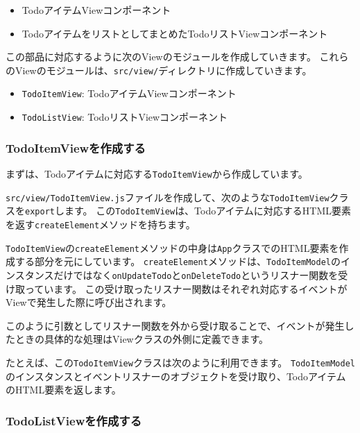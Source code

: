 \begin{itemize}
\item
  TodoアイテムViewコンポーネント
\item
  TodoアイテムをリストとしてまとめたTodoリストViewコンポーネント
\end{itemize}

この部品に対応するように次のViewのモジュールを作成していきます。
これらのViewのモジュールは、\texttt{src/view/}ディレクトリに作成していきます。

\begin{itemize}
\item
  \texttt{TodoItemView}: TodoアイテムViewコンポーネント
\item
  \texttt{TodoListView}: TodoリストViewコンポーネント
\end{itemize}

\hypertarget{TodoItemView}{%
\subsubsection{TodoItemViewを作成する}\label{TodoItemView}}

まずは、Todoアイテムに対応する\texttt{TodoItemView}から作成しています。

\texttt{src/view/TodoItemView.js}ファイルを作成して、次のような\texttt{TodoItemView}クラスを\texttt{export}します。
この\texttt{TodoItemView}は、Todoアイテムに対応するHTML要素を返す\texttt{createElement}メソッドを持ちます。
\newpage


\texttt{TodoItemView}の\texttt{createElement}メソッドの中身は\texttt{App}クラスでのHTML要素を作成する部分を元にしています。
\texttt{createElement}メソッドは、\texttt{TodoItemModel}のインスタンスだけではなく\texttt{onUpdateTodo}と\texttt{onDeleteTodo}というリスナー関数を受け取っています。
この受け取ったリスナー関数はそれぞれ対応するイベントがViewで発生した際に呼び出されます。

このように引数としてリスナー関数を外から受け取ることで、イベントが発生したときの具体的な処理はViewクラスの外側に定義できます。

たとえば、この\texttt{TodoItemView}クラスは次のように利用できます。
\texttt{TodoItemModel}のインスタンスとイベントリスナーのオブジェクトを受け取り、TodoアイテムのHTML要素を返します。



\hypertarget{TodoListView}{%
\subsubsection{TodoListViewを作成する}\label{TodoListView}}

